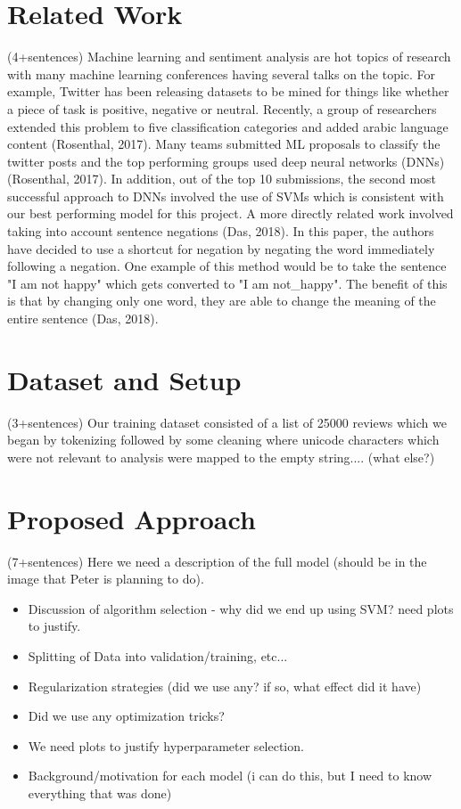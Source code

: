 \documentclass{amsart}
\theoremstyle{definition}
\theoremstyle{remark}
\numberwithin{equation}{section}
\begin{document}
\section{Related Work}(4+sentences)
Machine learning and sentiment analysis are hot topics of research with many machine learning conferences having several talks on the topic.  For example, Twitter has been releasing datasets to be mined for things like whether a piece of task is positive, negative or neutral.  Recently, a group of researchers extended this problem to five classification categories and added arabic language content (Rosenthal, 2017).  Many teams submitted ML proposals to classify the twitter posts and the top performing groups used deep neural networks (DNNs) (Rosenthal, 2017).  In addition, out of the top 10 submissions, the second most successful approach to DNNs involved the use of SVMs which is consistent with our best performing model for this project.  A more directly related work involved taking into account sentence negations (Das, 2018).  In this paper, the authors have decided to use a shortcut for negation by negating the word immediately following a negation.  One example of this method would be to take the sentence "I am not happy" which gets converted to "I am not\_happy".  The benefit of this is that by changing only one word, they are able to change the meaning of the entire sentence (Das, 2018).
\section{Dataset and Setup}(3+sentences)
Our training dataset consisted of a list of 25000 reviews which we began by tokenizing followed by some cleaning where unicode characters which were not relevant to analysis were mapped to the empty string.... (what else?)
\section{Proposed Approach}(7+sentences)
Here we need a description of the full model (should be in the image that Peter is planning to do).
\begin{itemize}
	\item Discussion of algorithm selection - why did we end up using SVM?  need plots to justify.
	\item Splitting of Data into validation/training, etc...
	\item Regularization strategies (did we use any?  if so, what effect did it have)
	\item Did we use any optimization tricks?
	\item We need plots to justify hyperparameter selection.
	\item Background/motivation for each model (i can do this, but I need to know everything that was done)
\end{itemize}
\end{document}
